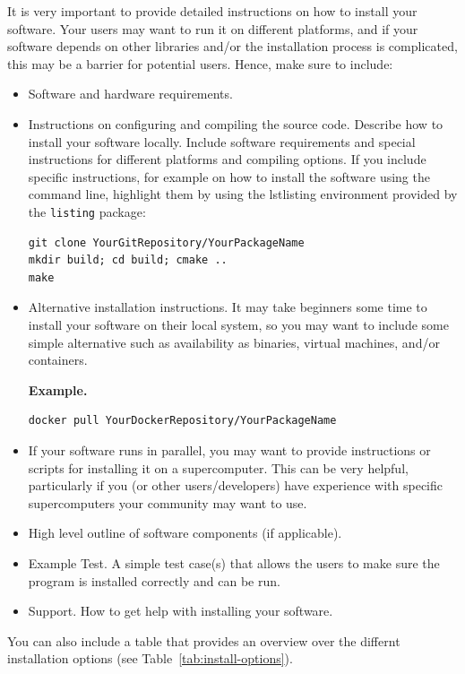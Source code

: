 \documentclass{article}
\begin{document}
It is very important to provide detailed instructions on how to install your software. Your users may want to run it on different platforms, and if your software depends on other libraries and/or the installation process is complicated, this may be a barrier for potential users. 
Hence, make sure to include:
\begin{itemize}
\item Software and hardware requirements.
\item Instructions on configuring and compiling the source code. Describe how to install your software locally. Include software requirements and special instructions for different platforms and compiling options.
If you include specific instructions, for example on how to install the software using the command line, highlight them by using the lstlisting environment provided by the \texttt{listing} package:
\begin{lstlisting}[frame=single,language=ksh]
git clone YourGitRepository/YourPackageName
mkdir build; cd build; cmake ..
make
\end{lstlisting}

\item Alternative installation instructions. It may take beginners some time to install your software on their local system, so you may want to include some simple alternative such as availability as binaries, virtual machines, and/or containers.

\textbf{Example.}
\begin{lstlisting}[frame=single,language=ksh]
docker pull YourDockerRepository/YourPackageName
\end{lstlisting}

\item If your software runs in parallel, you may want to provide instructions or scripts for installing it on a supercomputer. This can be very helpful, particularly if you (or other users/developers) have experience with specific supercomputers your community may want to use. 
\item High level outline of software components (if applicable).
\item Example Test. A simple test case(s) that allows the users to make sure the program is installed correctly and can be run.
\item Support. How to get help with installing your software.
\end{itemize}

You can also include a table that provides an overview over the differnt installation options (see Table~\ref{tab:install-options}). 
\end{document}

